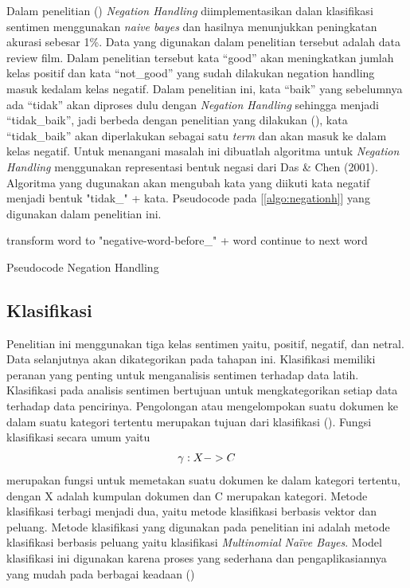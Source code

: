 Dalam penelitian \citeauthor{NARAYANAN2013} (\cite*{NARAYANAN2013}) \textit{Negation Handling} diimplementasikan dalan klasifikasi sentimen menggunakan \textit{naive bayes} dan hasilnya menunjukkan peningkatan akurasi sebesar 1\%. Data yang digunakan dalam penelitian tersebut adalah data review film. Dalam penelitian tersebut kata “good” akan meningkatkan jumlah kelas positif dan kata “not\_good” yang sudah dilakukan negation handling masuk kedalam kelas negatif.
Dalam penelitian ini, kata “baik” yang sebelumnya ada “tidak” akan diproses dulu dengan \textit{Negation Handling} sehingga menjadi “tidak\_baik”, jadi berbeda dengan penelitian yang dilakukan \citeauthor{NARAYANAN2013} (\cite*{NARAYANAN2013}), kata “tidak\_baik” akan diperlakukan sebagai satu \textit{term} dan akan masuk ke dalam kelas negatif. Untuk menangani masalah ini dibuatlah algoritma untuk \textit{Negation Handling} menggunakan representasi bentuk negasi dari Das \& Chen (2001). Algoritma yang dugunakan akan mengubah kata yang diikuti kata negatif menjadi bentuk "tidak\_" + kata. Pseudocode pada [\ref{algo:negationh}] yang digunakan dalam penelitian ini.

\begin{algorithm}
	\DontPrintSemicolon %
	 {
		 {
			transform word to "negative-word-before\_" + word
		}
		 {
			continue to next word 
		}
	}
	
	\caption{Pseudocode Negation Handling}
	\label{algo:negationh}
\end{algorithm}

\subsection*{Klasifikasi}
Penelitian ini menggunakan tiga kelas sentimen yaitu, positif, negatif, dan netral. Data selanjutnya akan dikategorikan pada tahapan ini. Klasifikasi memiliki peranan yang penting untuk menganalisis sentimen terhadap data latih.  Klasifikasi pada analisis sentimen bertujuan untuk mengkategorikan setiap data terhadap data pencirinya. Pengolongan atau mengelompokan suatu dokumen ke dalam suatu kategori tertentu merupakan tujuan dari klasifikasi (\cite{MANNING2008}). Fungsi klasifikasi secara umum yaitu
\begin{equation}
\begin{split}
\tiny
\gamma : X -> C
\label{eq:klasifikasi}
\normalsize
\end{split}
\end{equation}
merupakan fungsi untuk memetakan suatu dokumen ke dalam kategori tertentu, dengan X adalah kumpulan dokumen dan C merupakan kategori. Metode klasifikasi terbagi menjadi dua, yaitu metode klasifikasi berbasis vektor dan peluang. Metode klasifikasi yang digunakan pada penelitian ini adalah metode klasifikasi berbasis peluang yaitu klasifikasi \textit{Multinomial Naïve Bayes}. Model klasifikasi ini digunakan karena proses yang sederhana dan pengaplikasiannya yang mudah pada berbagai keadaan (\cite{MANNING2008})

